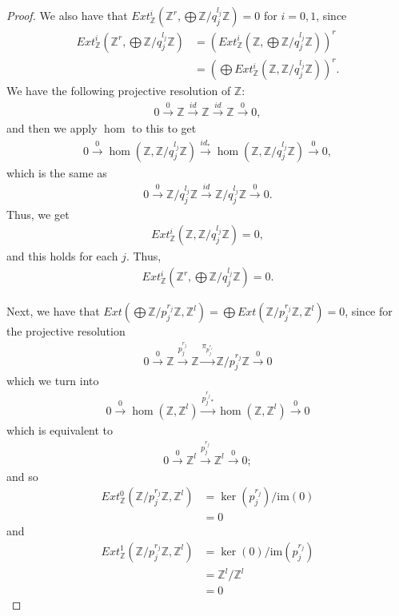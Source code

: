 \documentclass[12pt]{extarticle}
\newcommand{\im}{\text{im}}
\newcommand{\Z}{\mathbb{Z}}
\newcommand{\<}{\langle}
\renewcommand{\>}{\rangle}
\theoremstyle{definition}
\begin{document}
\begin{proof}
  We also have that $Ext_{\Z}^i(\Z^r, \bigoplus \Z/q_j^{l_j}\Z) = 0$ for $i=0,1$, since
  \begin{align*}
    Ext_{\Z}^i(\Z^r, \bigoplus \Z/q_j^{l_j}\Z)
    &= (Ext_{\Z}^i(\Z, \bigoplus \Z/q_j^{l_j}\Z))^r \\
    &= (\bigoplus Ext_{\Z}^i(\Z,\Z/q_j^{l_j}\Z))^r.
  \end{align*}
  We have the following projective resolution of $\Z$:
  \begin{align*}
    0 \xrightarrow{0} \Z \xrightarrow{id} \Z \xrightarrow{id} \Z \xrightarrow{0} 0,
  \end{align*}
  and then we apply $\hom$ to this to get
  \begin{align*}
    0 \xrightarrow{0} \hom(\Z, \Z/q_j^{l_j}\Z) \xrightarrow{id_*} \hom(\Z, \Z/q_j^{l_j}\Z) \xrightarrow{0} 0,    
  \end{align*}
  which is the same as 
  \begin{align*}
    0 \xrightarrow{0} \Z/q_j^{l_j}\Z \xrightarrow{id} \Z/q_j^{l_j}\Z \xrightarrow{0} 0.
  \end{align*}
  Thus, we get
  \begin{align*}
    Ext_{\Z}^i(\Z,\Z/q_j^{l_j}\Z) = 0,
  \end{align*}
  and this holds for each $j$. Thus,
  \begin{align*}
    Ext_{\Z}^i(\Z^r, \bigoplus \Z/q_j^{l_j}\Z) = 0.
  \end{align*}

  Next, we have that $Ext(\bigoplus \Z/p_j^{r_j} \Z, \Z^l) =\bigoplus Ext( \Z/p_j^{r_j} \Z, \Z^l) = 0$, since for the projective resolution
  \begin{align*}
    0 \xrightarrow{0} \Z \xrightarrow{p_j^{r_j}} \Z \xrightarrow{\pi_{p_j^{r_j}}} \Z / p_j^{r_j} \Z \xrightarrow{0} 0 
  \end{align*}
  which we turn into 
  \begin{align*}
    0 \xrightarrow{0} \hom(\Z, \Z^l) \xrightarrow{p_j^{r_j}_*} \hom(\Z, \Z^l) \xrightarrow{0} 0 
  \end{align*}
  which is equivalent to
  \begin{align*}
    0 \xrightarrow{0} \Z^l \xrightarrow{p_j^{r_j}} \Z^l \xrightarrow{0} 0;
  \end{align*}
  and so
  \begin{align*}
    Ext_{\Z}^0(\Z/p_j^{r_j} \Z, \Z^l)
    &= \ker(p_j^{r_j})/\im(0) \\
    &= 0
  \end{align*}
  and
  \begin{align*}
    Ext_{\Z}^1(\Z/p_j^{r_j} \Z, \Z^l)
    &= \ker(0)/\im(p_j^{r_j}) \\
    &= \Z^l/\Z^l \\
    &= 0 
  \end{align*}


\end{proof}
\end{document}

